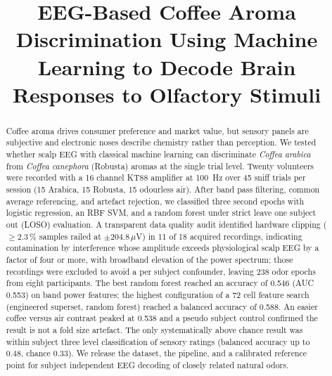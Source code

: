 \documentclass[conference]{IEEEtran}
\begin{document}
\title{EEG-Based Coffee Aroma Discrimination Using Machine Learning to Decode Brain Responses to Olfactory Stimuli\\
}

\author{%
}

\maketitle

\begin{abstract}
Coffee aroma drives consumer preference and market value, but sensory panels are subjective and electronic noses describe chemistry rather than perception. We tested whether scalp EEG with classical machine learning can discriminate \textit{Coffea arabica} from \textit{Coffea canephora} (Robusta) aromas at the single trial level. Twenty volunteers were recorded with a 16 channel KT88 amplifier at 100~Hz over 45 sniff trials per session (15 Arabica, 15 Robusta, 15 odourless air). After band pass filtering, common average referencing, and artefact rejection, we classified three second epochs with logistic regression, an RBF SVM, and a random forest under strict leave one subject out (LOSO) evaluation. A transparent data quality audit identified hardware clipping ($\geq 2.3\,\%$ samples railed at $\pm 204.8\,\mu$V) in 11 of 18 acquired recordings, indicating contamination by interference whose amplitude exceeds physiological scalp EEG by a factor of four or more, with broadband elevation of the power spectrum; those recordings were excluded to avoid a per subject confounder, leaving 238 odor epochs from eight participants. The best random forest reached an accuracy of 0.546 (AUC 0.553) on band power features; the highest configuration of a 72 cell feature search (engineered superset, random forest) reached a balanced accuracy of 0.588. An easier coffee versus air contrast peaked at 0.538 and a pseudo subject control confirmed the result is not a fold size artefact. The only systematically above chance result was within subject three level classification of sensory ratings (balanced accuracy up to 0.48, chance 0.33). We release the dataset, the pipeline, and a calibrated reference point for subject independent EEG decoding of closely related natural odors.
\end{abstract}
\end{document}
